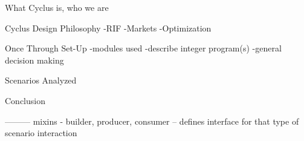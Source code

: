 What Cyclus is, who we are

Cyclus Design Philosophy
-RIF
-Markets
-Optimization

Once Through Set-Up
-modules used
-describe integer program(s)
-general decision making

Scenarios Analyzed

Conclusion

---------
mixins - builder, producer, consumer
 -- defines interface for that type of scenario interaction
